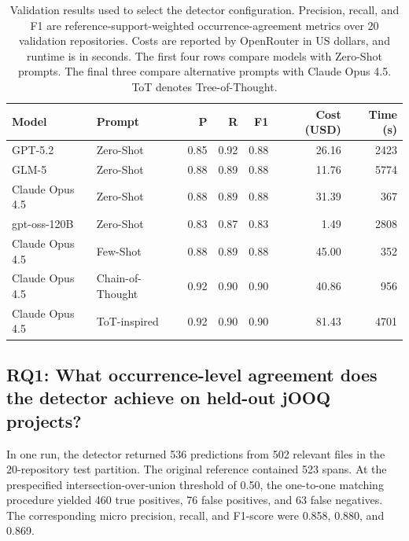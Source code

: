 \begin{table}[tbp]
    \centering
    \scriptsize
    \caption{Validation results used to select the detector configuration. Precision, recall, and F1 are reference-support-weighted occurrence-agreement metrics over \num{20} validation repositories. Costs are reported by OpenRouter in US dollars, and runtime is in seconds. The first four rows compare models with Zero-Shot prompts. The final three compare alternative prompts with Claude Opus 4.5. ToT denotes Tree-of-Thought.}
    \label{tab:configurationSelection}
    \begin{tabular}{llrrrrr}
        \hline
        \textbf{Model} & \textbf{Prompt} & \textbf{P} & \textbf{R} & \textbf{F1} & \textbf{Cost (USD)} & \textbf{Time (s)} \\
        \hline
        GPT-5.2 & Zero-Shot & 0.85 & 0.92 & 0.88 & 26.16 & 2423 \\
        GLM-5 & Zero-Shot & 0.88 & 0.89 & 0.88 & 11.76 & 5774 \\
        Claude Opus 4.5 & Zero-Shot & 0.88 & 0.89 & 0.88 & 31.39 & 367 \\
        gpt-oss-120B & Zero-Shot & 0.83 & 0.87 & 0.83 & 1.49 & 2808 \\
        Claude Opus 4.5 & Few-Shot & 0.88 & 0.89 & 0.88 & 45.00 & 352 \\
        Claude Opus 4.5 & Chain-of-Thought & 0.92 & 0.90 & 0.90 & 40.86 & 956 \\
        Claude Opus 4.5 & ToT-inspired & 0.92 & 0.90 & 0.90 & 81.43 & 4701 \\
        \hline
    \end{tabular}
\end{table}

\subsection{RQ1: What occurrence-level agreement does the detector achieve on held-out jOOQ projects?}\label{sec:rq1Agreement}

In one run, the detector returned \num{536} predictions from \num{502} relevant files in the \num{20}-repository test partition. The original reference contained \num{523} spans. At the prespecified intersection-over-union threshold of \num{0.50}, the one-to-one matching procedure yielded \num{460} true positives, \num{76} false positives, and \num{63} false negatives. The corresponding micro precision, recall, and F1-score were \num{0.858}, \num{0.880}, and \num{0.869}.

